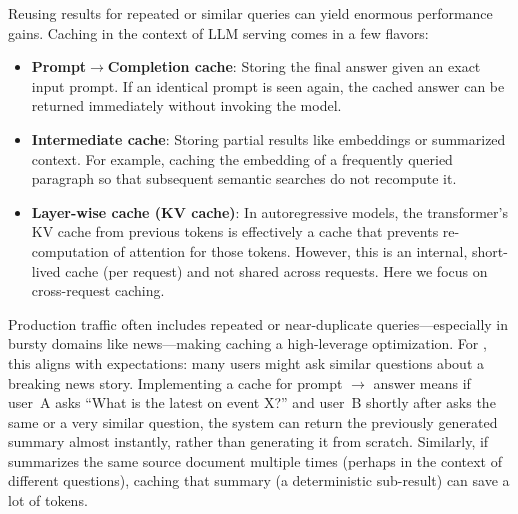 Reusing results for repeated or similar queries can yield enormous performance gains. Caching in the context of LLM serving comes in a few flavors:
\begin{itemize}
\item \textbf{Prompt$\to$Completion cache}: Storing the final answer given an exact input prompt. If an identical prompt is seen again, the cached answer can be returned immediately without invoking the model.
\item \textbf{Intermediate cache}: Storing partial results like embeddings or summarized context. For example, caching the embedding of a frequently queried paragraph so that subsequent semantic searches do not recompute it.
\item \textbf{Layer-wise cache (KV cache)}: In autoregressive models, the transformer’s KV cache from previous tokens is effectively a cache that prevents re-computation of attention for those tokens. However, this is an internal, short-lived cache (per request) and not shared across requests. Here we focus on cross-request caching.
\end{itemize}

Production traffic often includes repeated or near-duplicate queries---especially in bursty domains like news---making caching a high-leverage optimization. For \ishtar{}, this aligns with expectations: many users might ask similar questions about a breaking news story. Implementing a cache for prompt $\to$ answer means if user~A asks ``What is the latest on event X?'' and user~B shortly after asks the same or a very similar question, the system can return the previously generated summary almost instantly, rather than generating it from scratch. Similarly, if \ishtar{} summarizes the same source document multiple times (perhaps in the context of different questions), caching that summary (a deterministic sub-result) can save a lot of tokens.

